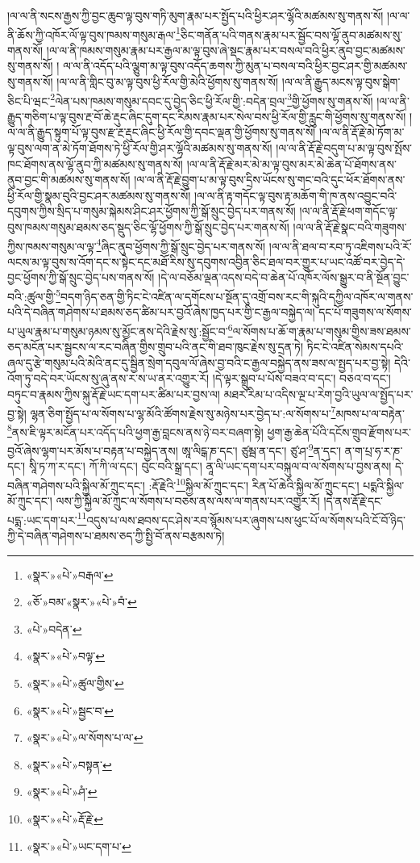 །ལ་ལ་ནི་སངས་རྒྱས་ཀྱི་བྱང་ཆུབ་ལྟ་བུས་གཏི་མུག་རྣམ་པར་སྤྱོད་པའི་ཕྱིར་ཤར་ལྷོའི་མཚམས་སུ་གནས་སོ། །ལ་ལ་ནི་ཆོས་ཀྱི་འཁོར་ལོ་ལྟ་བུས་ཁམས་གསུམ་རྒལ་\footnote{«སྣར་»«པེ་»བརྒལ་}ཅིང་གནོན་པའི་གནས་རྣམ་པར་སྦྱོང་བས་ལྷོ་ནུབ་མཚམས་སུ་གནས་སོ། །ལ་ལ་ནི་ཁམས་གསུམ་རྣམ་པར་རྒྱལ་མ་ལྟ་བུས་ཞེ་སྡང་རྣམ་པར་བསལ་བའི་ཕྱིར་ནུབ་བྱང་མཚམས་སུ་གནས་སོ། །
ལ་ལ་ནི་འདོད་པའི་ལྕུག་མ་ལྟ་བུས་འདོད་ཆགས་ཀྱི་མུན་པ་བསལ་བའི་ཕྱིར་བྱང་ཤར་གྱི་མཚམས་སུ་གནས་སོ། །ལ་ལ་ནི་གླིང་བུ་མ་ལྟ་བུས་ཕྱི་རོལ་གྱི་མེའི་ཕྱོགས་སུ་གནས་སོ། །ལ་ལ་ནི་རྒྱུད་མངས་ལྟ་བུས་སྒེག་ཅིང་པི་ཝང་\footnote{«ཅོ་»བམ་«སྣར་»«པེ་»བཾ་}ལེན་པས་ཁམས་གསུམ་དབང་དུ་བྱེད་ཅིང་ཕྱི་རོལ་གྱི་:བདེན་བྲལ་\footnote{«པེ་»བདེན་}གྱི་ཕྱོགས་སུ་གནས་སོ། །ལ་ལ་ནི་རྒྱུད་གཅིག་པ་ལྟ་བུས་རྔ་བོ་ཆེ་རྡུང་ཞིང་དུག་དང་རིམས་རྣམ་པར་སེལ་བས་ཕྱི་རོལ་གྱི་རླུང་གི་ཕྱོགས་སུ་གནས་སོ། །ལ་ལ་ནི་རྒྱུད་སྟུག་པོ་ལྟ་བུས་རྫ་རྔ་རྡུང་ཞིང་ཕྱི་རོལ་གྱི་དབང་ལྡན་གྱི་ཕྱོགས་སུ་གནས་སོ། །ལ་ལ་ནི་རྡོ་རྗེ་མེ་ཏོག་མ་ལྟ་བུས་ལག་ན་མེ་ཏོག་ཐོགས་ཏེ་ཕྱི་རོལ་གྱི་ཤར་ལྷོའི་མཚམས་སུ་གནས་སོ། །ལ་ལ་ནི་རྡོ་རྗེ་བདུག་པ་མ་ལྟ་བུས་སྤོས་ཁང་ཐོགས་ནས་ལྷོ་ནུབ་ཀྱི་མཚམས་སུ་གནས་སོ། །ལ་ལ་ནི་རྡོ་རྗེ་མར་མེ་མ་ལྟ་བུས་མར་མེ་ཆེན་པོ་ཐོགས་ནས་ནུབ་བྱང་གི་མཚམས་སུ་གནས་སོ། །ལ་ལ་ནི་རྡོ་རྗེ་བྱུག་པ་མ་ལྟ་བུས་དྲིས་ཡོངས་སུ་གང་བའི་དུང་ཕོར་ཐོགས་ནས་ཕྱི་རོལ་གྱི་སྣམ་བུའི་བྱང་ཤར་མཚམས་སུ་གནས་སོ། །ལ་ལ་ནི་རྟ་གདོང་ལྟ་བུས་རྟ་མཆོག་གི་ཁ་ནས་འབྱུང་བའི་དབུགས་ཀྱིས་སྲིད་པ་གསུམ་སྐེམས་ཤིང་ཤར་ཕྱོགས་ཀྱི་སྒོ་སྲུང་བྱེད་པར་གནས་སོ། །ལ་ལ་ནི་རྡོ་རྗེ་ཕག་གདོང་ལྟ་བུས་ཁམས་གསུམ་ཐམས་ཅད་སྡུད་ཅིང་ལྷོ་ཕྱོགས་ཀྱི་སྒོ་སྲུང་བྱེད་པར་གནས་སོ། །ལ་ལ་ནི་རྡོ་རྗེ་སྣང་བའི་གཟུགས་ཀྱིས་ཁམས་གསུམ་ལ་ལྟ་\footnote{«སྣར་»«པེ་»བལྟ་}ཞིང་ནུབ་ཕྱོགས་ཀྱི་སྒོ་སྲུང་བྱེད་པར་གནས་སོ། །ལ་ལ་ནི་ཐལ་བ་རབ་ཏུ་འཇིགས་པའི་རོ་ལངས་མ་ལྟ་བུས་ས་འོག་དང་ས་སྟེང་དང་མཐོ་རིས་སུ་དབུགས་འབྱིན་ཅིང་ཐལ་བར་གྱུར་པ་ཡང་འཚོ་བར་བྱེད་དེ་བྱང་ཕྱོགས་ཀྱི་སྒོ་སྲུང་བྱེད་པས་གནས་སོ། །དེ་ལ་བཅོམ་ལྡན་འདས་བདེ་བ་ཆེན་པོ་འཁོར་ལོས་སྒྱུར་བ་ནི་སྔོན་བྱུང་བའི་:ཚུལ་གྱི་\footnote{«སྣར་»«པེ་»ཚུལ་གྱིས་}བདག་ཉིད་ཅན་གྱི་ཏིང་ངེ་འཛིན་ལ་དགོངས་པ་སྔོན་དུ་འགྲོ་བས་རང་གི་སྐུའི་དཀྱིལ་འཁོར་ལ་གནས་པའི་དེ་བཞིན་གཤེགས་པ་ཐམས་ཅད་ཚིམ་པར་བྱའོ་ཞེས་ཁྱད་པར་གྱི་ང་རྒྱལ་བསྐྱེད་ལ། དང་པོ་གཟུགས་ལ་སོགས་པ་ཡུལ་རྣམ་པ་གསུམ་ཉམས་སུ་མྱོང་ནས་དེའི་རྗེས་སུ་:སྦྱོང་བ་\footnote{«སྣར་»«པེ་»སྦྱང་བ་}ལ་སོགས་པ་ཆོ་ག་རྣམ་པ་གསུམ་གྱིས་ཟས་ཐམས་ཅད་མངོན་པར་སྦྱངས་ལ་རང་བཞིན་གྱིས་གྲུབ་པའི་ནང་གི་ཐབ་ཁུང་རྗེས་སུ་དྲན་ཏེ། ཏིང་ངེ་འཛིན་སེམས་དཔའི་ཞལ་དུ་རྩེ་གསུམ་པའི་མེའི་ནང་དུ་སྦྱིན་སྲེག་དབུལ་ལོ་ཞེས་བྱ་བའི་ང་རྒྱལ་བསྐྱེད་ནས་ཟས་ལ་སྤྱད་པར་བྱ་སྟེ། དེའི་འོག་ཏུ་བདེ་བར་ཡོངས་སུ་ཞུ་ནས་ར་ས་ཡ་ནར་འགྱུར་རོ། །དེ་ལྟར་སྒྲུབ་པ་པོས་བཟའ་བ་དང་། བཅའ་བ་དང་། བཏུང་བ་རྣམས་ཀྱིས་སྐུ་རྡོ་རྗེ་ཡང་དག་པར་ཚིམ་པར་བྱས་ལ། མཐར་རིམ་པ་འདིས་ལྔ་པ་རེག་བྱའི་ཡུལ་ལ་སྤྱོད་པར་བྱ་སྟེ། ལྷན་ཅིག་སྤྱོད་པ་ལ་སོགས་པ་ལྷ་མོའི་ཚོགས་རྗེས་སུ་མཉེས་པར་བྱེད་པ་:ལ་སོགས་པ་\footnote{«སྣར་»«པེ་»ལ་སོགས་པ་ལ་}མཁས་པ་ལ་བརྟེན་\footnote{«སྣར་»«པེ་»བསྟན་}ནས་ཇི་ལྟར་མངོན་པར་འདོད་པའི་ཕྱག་རྒྱ་བླངས་ནས་ཉེ་བར་བཞག་སྟེ། ཕྱག་རྒྱ་ཆེན་པོའི་དངོས་གྲུབ་རྫོགས་པར་བྱའོ་ཞེས་ལྷག་པར་མོས་པ་བརྟན་པ་བསྐྱེད་ནས། ཨཱ་ལིངྒ་ཎ་དང་། ཙུམྦ་ན་དང་། ཙུ་ཤ་\footnote{«སྣར་»«པེ་»ཤཾ་}ན་དང་། ན་ག་པྲ་ཧ་ར་ཎ་དང་། སཱི་ཏ་ཀ་ར་དང་། ཀོ་ཀི་ལ་དང་། བུང་བའི་སྒྲ་དང་། ནཱ་ལི་ཡང་དག་པར་བསྐུལ་བ་ལ་སོགས་པ་བྱས་ནས། དེ་བཞིན་གཤེགས་པའི་སྐྱིལ་མོ་ཀྲུང་དང་། :རྡོ་རྗེའི་\footnote{«སྣར་»«པེ་»རྡོ་རྗེ་}སྐྱིལ་མོ་ཀྲུང་དང་། རིན་པོ་ཆེའི་སྐྱིལ་མོ་ཀྲུང་དང་། པདྨའི་སྐྱིལ་མོ་ཀྲུང་དང་། ལས་ཀྱི་སྐྱིལ་མོ་ཀྲུང་ལ་སོགས་པ་བཅས་ནས་ལས་ལ་གནས་པར་འགྱུར་རོ། །དེ་ནས་རྡོ་རྗེ་དང་པདྨ་:ཡང་དག་པར་\footnote{«སྣར་»«པེ་»ཡང་དག་པ་}འདུས་པ་ལས་ཐབས་དང་ཤེས་རབ་སྙོམས་པར་ཞུགས་པས་ཕུང་པོ་ལ་སོགས་པའི་ངོ་བོ་ཉིད་ཀྱི་དེ་བཞིན་གཤེགས་པ་ཐམས་ཅད་ཀྱི་སྤྱི་བོ་ནས་བརྩམས་ཏེ། 
